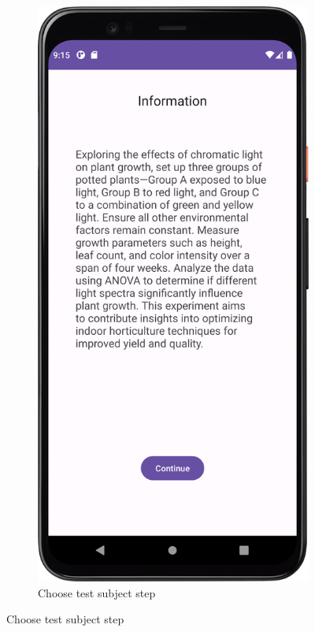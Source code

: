 \begin{figure}[htbp]
\begin{subfigure}[b]{0.3\textwidth}
        \includegraphics[width=\textwidth]{content/06_demonstration_of_the_artifact/Screenshot_InfoScreen.png}
        \caption{Choose test subject step}

\end{subfigure}
\end{figure}
